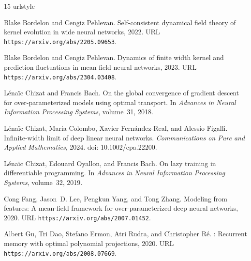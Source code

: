 \documentclass[11pt]{article}
\theoremstyle{definition}
\theoremstyle{remark}
\begin{document}
\begin{thebibliography}{15}
\providecommand{\natexlab}[1]{#1}
\providecommand{\url}[1]{\texttt{#1}}
\expandafter\ifx\csname urlstyle\endcsname\relax
  \providecommand{\doi}[1]{doi: #1}\else
  \providecommand{\doi}{doi: \begingroup \urlstyle{rm}\Url}\fi

Blake Bordelon and Cengiz Pehlevan.
\newblock Self-consistent dynamical field theory of kernel evolution in wide
  neural networks, 2022.
\newblock URL \url{https://arxiv.org/abs/2205.09653}.

Blake Bordelon and Cengiz Pehlevan.
\newblock Dynamics of finite width kernel and prediction fluctuations in mean
  field neural networks, 2023.
\newblock URL \url{https://arxiv.org/abs/2304.03408}.

L{\'e}na{\"i}c Chizat and Francis Bach.
\newblock On the global convergence of gradient descent for over-parameterized
  models using optimal transport.
\newblock In \emph{Advances in Neural Information Processing Systems},
  volume~31, 2018.

L{\'e}na{\"i}c Chizat, Maria Colombo, Xavier Fern\'andez-Real, and Alessio
  Figalli.
\newblock Infinite-width limit of deep linear neural networks.
\newblock \emph{Communications on Pure and Applied Mathematics}, 2024.
\newblock \doi{10.1002/cpa.22200}.

L{\'e}na{\"i}c Chizat, Edouard Oyallon, and Francis Bach.
\newblock On lazy training in differentiable programming.
\newblock In \emph{Advances in Neural Information Processing Systems},
  volume~32, 2019.

Cong Fang, Jason~D. Lee, Pengkun Yang, and Tong Zhang.
\newblock Modeling from features: A mean-field framework for over-parameterized
  deep neural networks, 2020.
\newblock URL \url{https://arxiv.org/abs/2007.01452}.

Albert Gu, Tri Dao, Stefano Ermon, Atri Rudra, and Christopher R{\'e}.
: Recurrent memory with optimal polynomial projections, 2020.
\newblock URL \url{https://arxiv.org/abs/2008.07669}.


\end{thebibliography}
\end{document}
